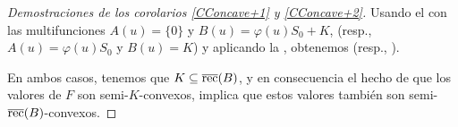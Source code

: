 \begin{proof}[Demostraciones de los corolarios \ref{CConcave+1} y \ref{CConcave+2}]

	Usando el  con las multifunciones $A(u) = \{0\}$ y
	$B(u) = \varphi(u)S_0 + K$, (resp., $A(u)=\varphi(u)S_0$ y $B(u)=K$)
	y aplicando la , obtenemos  (resp., ).
	
	En ambos casos, tenemos que $K\subseteq\overline{\mathop{\hbox{\rm rec}}\nolimits}(B)$, y en consecuencia
	el hecho de que los valores de $F$ son semi-$K$-convexos, implica que estos
	valores tambi\'en son semi-$\overline{\mathop{\hbox{\rm rec}}\nolimits}(B)$-convexos.
\end{proof}
